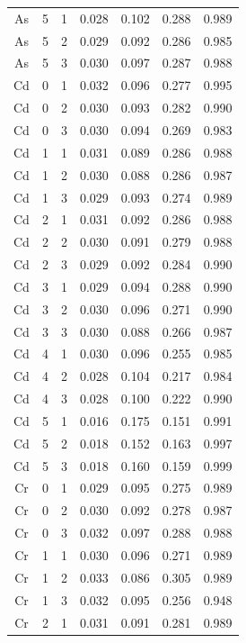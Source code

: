 \documentclass[ms, hidelinks]{uncgdissertationexp}
\theoremstyle{plain}
\theoremstyle{definition}
\theoremstyle{remark}
\begin{document}
\begin{longtable}{ccccccc}
As & 5 & 1 & 0.028 & 0.102 & 0.288 & 0.989\\
\rowcolor{gray!6}  As & 5 & 2 & 0.029 & 0.092 & 0.286 & 0.985\\
As & 5 & 3 & 0.030 & 0.097 & 0.287 & 0.988\\
\rowcolor{gray!6}  Cd & 0 & 1 & 0.032 & 0.096 & 0.277 & 0.995\\
Cd & 0 & 2 & 0.030 & 0.093 & 0.282 & 0.990\\
\rowcolor{gray!6}  Cd & 0 & 3 & 0.030 & 0.094 & 0.269 & 0.983\\
Cd & 1 & 1 & 0.031 & 0.089 & 0.286 & 0.988\\
\rowcolor{gray!6}  Cd & 1 & 2 & 0.030 & 0.088 & 0.286 & 0.987\\
Cd & 1 & 3 & 0.029 & 0.093 & 0.274 & 0.989\\
\rowcolor{gray!6}  Cd & 2 & 1 & 0.031 & 0.092 & 0.286 & 0.988\\
Cd & 2 & 2 & 0.030 & 0.091 & 0.279 & 0.988\\
\rowcolor{gray!6}  Cd & 2 & 3 & 0.029 & 0.092 & 0.284 & 0.990\\
Cd & 3 & 1 & 0.029 & 0.094 & 0.288 & 0.990\\
\rowcolor{gray!6}  Cd & 3 & 2 & 0.030 & 0.096 & 0.271 & 0.990\\
Cd & 3 & 3 & 0.030 & 0.088 & 0.266 & 0.987\\
\rowcolor{gray!6}  Cd & 4 & 1 & 0.030 & 0.096 & 0.255 & 0.985\\
Cd & 4 & 2 & 0.028 & 0.104 & 0.217 & 0.984\\
\rowcolor{gray!6}  Cd & 4 & 3 & 0.028 & 0.100 & 0.222 & 0.990\\
Cd & 5 & 1 & 0.016 & 0.175 & 0.151 & 0.991\\
\rowcolor{gray!6}  Cd & 5 & 2 & 0.018 & 0.152 & 0.163 & 0.997\\
Cd & 5 & 3 & 0.018 & 0.160 & 0.159 & 0.999\\
\rowcolor{gray!6}  Cr & 0 & 1 & 0.029 & 0.095 & 0.275 & 0.989\\
Cr & 0 & 2 & 0.030 & 0.092 & 0.278 & 0.987\\
\rowcolor{gray!6}  Cr & 0 & 3 & 0.032 & 0.097 & 0.288 & 0.988\\
Cr & 1 & 1 & 0.030 & 0.096 & 0.271 & 0.989\\
\rowcolor{gray!6}  Cr & 1 & 2 & 0.033 & 0.086 & 0.305 & 0.989\\
Cr & 1 & 3 & 0.032 & 0.095 & 0.256 & 0.948\\
\rowcolor{gray!6}  Cr & 2 & 1 & 0.031 & 0.091 & 0.281 & 0.989\\

\end{longtable}
\end{document}
